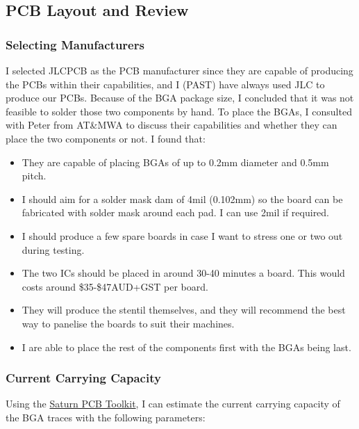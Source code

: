 \documentclass[10pt]{article}
\newcommand{\nl}{\newline \newline}
\begin{document}
\clearpage

\subsection{PCB Layout and Review} \label{sec:pcb}

\subsubsection{Selecting Manufacturers}
I selected JLCPCB as the PCB manufacturer since they are capable of producing the PCBs within their capabilities, and I (PAST) have always used JLC to produce our PCBs.
\nl
Because of the BGA package size, I concluded that it was not feasible to solder those two components by hand. To place the BGAs, I consulted with Peter from AT\&MWA to discuss their capabilities and whether they can place the two components or not. I found that:
\begin{itemize}[noitemsep]
    \item They are capable of placing BGAs of up to 0.2mm diameter and 0.5mm pitch.
    \item I should aim for a solder mask dam of 4mil (0.102mm) so the board can be fabricated with solder mask around each pad. I can use 2mil if required.
    \item I should produce a few spare boards in case I want to stress one or two out during testing.
    \item The two ICs should be placed in around 30-40 minutes a board. This would costs around \$35-\$47AUD+GST per board.
    \item They will produce the stentil themselves, and they will recommend the best way to panelise the boards to suit their machines.
    \item I are able to place the rest of the components first with the BGAs being last.
\end{itemize}

\subsubsection{Current Carrying Capacity}
Using the \href{https://saturnpcb.com/saturn-pcb-toolkit/}{Saturn PCB Toolkit}, I can estimate the current carrying capacity of the BGA traces with the following parameters:
\end{document}

